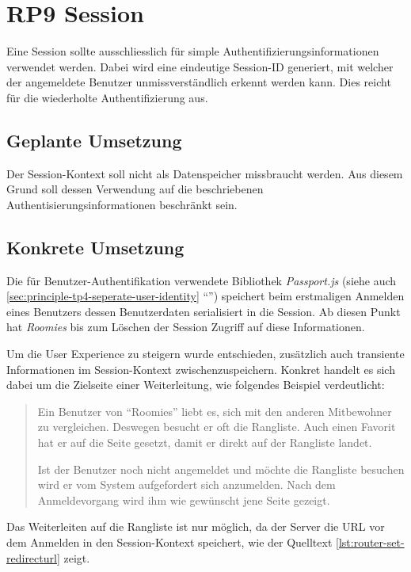\section{RP9 Session}
\label{sec:principle-rp9-session}

Eine Session sollte ausschliesslich für simple Authentifizierungsinformationen verwendet werden. Dabei wird eine eindeutige Session-ID generiert, mit welcher der angemeldete Benutzer unmissverständlich erkennt werden kann. Dies reicht für die wiederholte Authentifizierung aus.

\subsection*{Geplante Umsetzung}
Der Session-Kontext soll nicht als Datenspeicher missbraucht werden. Aus diesem Grund soll dessen Verwendung auf die beschriebenen Authentisierungsinformationen beschränkt sein.

\subsection*{Konkrete Umsetzung}
Die für Benutzer-Authentifikation verwendete Bibliothek \emph{Passport.js} \cite{Passportjs} (siehe auch \ref{sec:principle-tp4-seperate-user-identity} ``'') speichert beim erstmaligen Anmelden eines Benutzers dessen Benutzerdaten serialisiert in die Session. Ab diesen Punkt hat \emph{Roomies} bis zum Löschen der Session Zugriff auf diese Informationen.

Um die User Experience zu steigern wurde entschieden, zusätzlich auch transiente Informationen im Session-Kontext zwischenzuspeichern. Konkret handelt es sich dabei um die Zielseite einer Weiterleitung, wie folgendes Beispiel verdeutlicht:

\begin{quotation}
Ein Benutzer von ``Roomies'' liebt es, sich mit den anderen Mitbewohner zu vergleichen. Deswegen besucht er oft die Rangliste. Auch einen Favorit hat er auf die Seite gesetzt, damit er direkt auf der Rangliste landet.

Ist der Benutzer noch nicht angemeldet und möchte die Rangliste besuchen wird er vom System aufgefordert sich anzumelden. Nach dem Anmeldevorgang wird ihm wie gewünscht jene Seite gezeigt.
\end{quotation}

Das Weiterleiten auf die Rangliste ist nur möglich, da der Server die \gls{URL} vor dem Anmelden in den Session-Kontext speichert, wie der Quelltext \ref{lst:router-set-redirecturl} zeigt.

